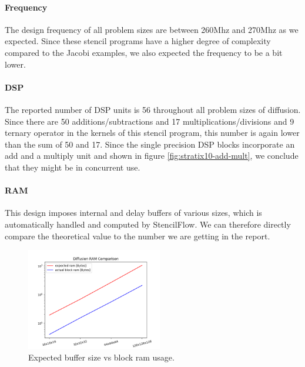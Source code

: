 \paragraph{Frequency}
The design frequency of all problem sizes are between 260Mhz and 270Mhz as we expected. Since these stencil programs have a higher degree of complexity compared to the Jacobi examples, we also expected the frequency to be a bit lower. 



\paragraph{DSP}
The reported number of DSP units is 56 throughout all problem sizes of diffusion. Since there are 50 additions/subtractions and 17 multiplications/divisions and 9 ternary operator in the kernels of this stencil program, this number is again lower than the sum of 50 and 17. Since the single precision DSP blocks incorporate an add and a multiply unit and shown in figure \ref{fig:stratix10-add-mult}, we conclude that they might be in concurrent use.

\paragraph{RAM}
This design imposes internal and delay buffers of various sizes, which is automatically handled and computed by StencilFlow. We can therefore directly compare the theoretical value to the number we are getting in the report.\\
\begin{figure}[h]
	\centering
	\includegraphics[height=12em]{plots/diffusion_ram_comparison.png}
	\caption{Expected buffer size vs block ram usage.}
	\label{fig:diffusion_ram_comparison}
\end{figure}


